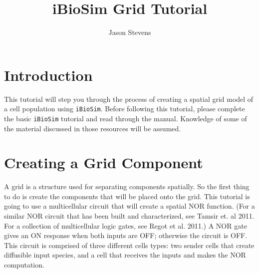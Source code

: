 \documentclass[titlepage,11pt]{article}
\title{iBioSim Grid Tutorial}
\author{Jason Stevens}
\begin{document}
\maketitle

  
\tableofcontents

\clearpage
  

\section{Introduction}

\noindent
This tutorial will step you through the process of creating a spatial grid model of a cell population using {\tt iBioSim}.  Before following this tutorial, please complete the basic {\tt iBioSim} tutorial and read through the manual.  Knowledge of some of the material discussed in those resources will be assumed.



\section{Creating a Grid Component}

\noindent
A grid is a structure used for separating components spatially.  So the first thing to do is create the components that will be placed onto the grid.  This tutorial is going to use a multicellular circuit that will create a spatial NOR function.  (For a similar NOR circuit that has been built and characterized, see Tamsir et. al 2011.  For a collection of multicellular logic gates, see Regot et al. 2011.)  A NOR gate gives an ON response when both inputs are OFF; otherwise the circuit is OFF.  This circuit is comprised of three different cells types: two sender cells that create diffusible input species, and a cell that receives the inputs and makes the NOR computation.
\end{document}
